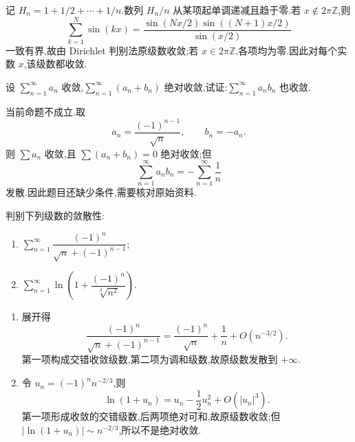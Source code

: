 \begin{solution}
    记 $H_n=1+1/2+\cdots+1/n$.数列 $H_n/n$ 从某项起单调递减且趋于零.若 $x\notin2\pi\mathbb{Z}$,则
    \[
        \displaystyle\sum\limits_{k=1}^{N}\sin(kx)
        =\dfrac{\sin(Nx/2)\sin((N+1)x/2)}{\sin(x/2)}
    \]
    一致有界,故由 Dirichlet 判别法原级数收敛;若 $x\in2\pi\mathbb{Z}$,各项均为零.因此对每个实数 $x$,该级数都收敛.
\end{solution}

\begin{example}
    设 $\displaystyle\sum\limits_{n=1}^{\infty}a_n$ 收敛,$\displaystyle\sum\limits_{n=1}^{\infty}(a_n+b_n)$ 绝对收敛,试证:$\displaystyle\sum\limits_{n=1}^{\infty}a_nb_n$ 也收敛.
\end{example}
\exampleblank

\begin{solution}
    当前命题不成立.取
    \[
        a_n=\dfrac{(-1)^{n-1}}{\sqrt n},
        \qquad b_n=-a_n.
    \]
    则 $\displaystyle \sum a_n$ 收敛,且 $\displaystyle \sum(a_n+b_n)=0$ 绝对收敛;但
    \[
        \displaystyle\sum\limits_{n=1}^{\infty}a_nb_n=-\sum\limits_{n=1}^{\infty}\dfrac{1}{n}
    \]
    发散.因此题目还缺少条件,需要核对原始资料.
\end{solution}

\begin{example}
    判别下列级数的敛散性:
    \begin{enumerate}
        \item $\displaystyle\sum\limits_{n=1}^{\infty}\dfrac{(-1)^n}{\sqrt n+(-1)^{n-1}}$;
        \item $\displaystyle\sum\limits_{n=1}^{\infty}\ln\left(1+\dfrac{(-1)^n}{\sqrt[3]{n^2}}\right)$.
    \end{enumerate}
\end{example}
\exampleblank

\begin{solution}
    \leavevmode
    \begin{enumerate}
        \item 展开得
              \[
                  \dfrac{(-1)^n}{\sqrt n+(-1)^{n-1}}
                  =\dfrac{(-1)^n}{\sqrt n}+\dfrac{1}{n}+O(n^{-3/2}).
              \]
              第一项构成交错收敛级数,第二项为调和级数,故原级数发散到 $+\infty$.
        \item 令 $u_n=(-1)^nn^{-2/3}$,则
              \[
                  \ln(1+u_n)=u_n-\dfrac{1}{2}u_n^2+O(|u_n|^3).
              \]
              第一项形成收敛的交错级数,后两项绝对可和,故原级数收敛;但
              $|\ln(1+u_n)|\sim n^{-2/3}$,所以不是绝对收敛.
    \end{enumerate}
\end{solution}

